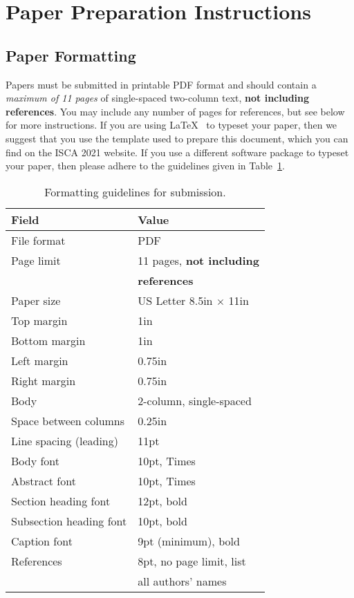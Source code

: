 \documentclass[conference]{IEEEtran}
\begin{document}
\section{Paper Preparation Instructions}

\subsection{Paper Formatting}
Papers must be submitted in printable PDF format and should contain a
{\em maximum of 11 pages} of single-spaced two-column text, {\bf not
  including references}.  You may include any number of pages for
references, but see below for more instructions.  If you are using
\LaTeX~\cite{lamport94} to typeset your paper, then we suggest that
you use the template used to prepare this document, which you can find
on the ISCA 2021 website. If you use a different
software package to typeset your paper, then please adhere to the
guidelines given in Table~\ref{table:formatting}.

\begin{scriptsize}
\begin{table}[h!]
  \centering
  \caption{Formatting guidelines for submission.}
  \label{table:formatting}
  \begin{tabular}{|l|l|}
    \hline
    \textbf{Field} & \textbf{Value}\\
    \hline
    \hline
    File format & PDF \\
    \hline
    Page limit & 11 pages, {\bf not including}\\
               & {\bf references}\\
    \hline
    Paper size & US Letter 8.5in $\times$ 11in\\
    \hline
    Top margin & 1in\\
    \hline
    Bottom margin & 1in\\
    \hline
    Left margin & 0.75in\\
    \hline
    Right margin & 0.75in\\
    \hline
    Body & 2-column, single-spaced\\
    \hline
    Space between columns & 0.25in\\
    \hline
    Line spacing (leading) & 11pt \\
    \hline
    Body font & 10pt, Times\\
    \hline
    Abstract font & 10pt, Times\\
    \hline
    Section heading font & 12pt, bold\\
    \hline
    Subsection heading font & 10pt, bold\\
    \hline
    Caption font & 9pt (minimum), bold\\
    \hline
    References & 8pt, no page limit, list \\
               & all authors' names\\
    \hline
  \end{tabular}
\end{table}
\end{scriptsize}
\end{document}
